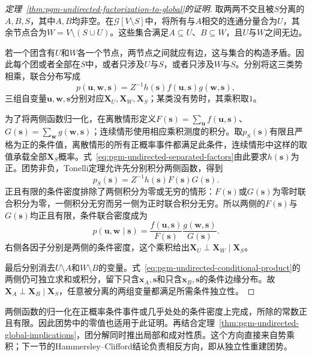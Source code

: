 \begin{proof}[定理~\ref{thm:pgm-undirected-factorization-to-global}的证明]
取两两不交且被$S$分离的$A,B,S$，其中$A,B$均非空。在$\mathcal{G}[V\setminus S]$中，将所有与$A$相交的连通分量合为$U$，其余节点合为$W=V\setminus(S\cup U)$。这些集合满足$A\subseteq U$、$B\subseteq W$，且$U$与$W$之间无边。

若一个团含有$U$和$W$各一个节点，两节点之间就应有边，这与集合的构造矛盾。因此每个团或者全部在$S$中，或者只涉及$U$与$S$，或者只涉及$W$与$S$。分别将这三类势相乘，联合分布写成
\begin{equation}
  p(\bm{u},\bm{w},\bm{s})
  =Z^{-1}h(\bm{s})f(\bm{u},\bm{s})g(\bm{w},\bm{s}),
  \label{eq:pgm-undirected-separated-factors}
\end{equation}
三组自变量$\bm{u},\bm{w},\bm{s}$分别对应$\bm{X}_U,\bm{X}_W,\bm{X}_S$；某类没有势时，其乘积取$1$。

为了将两侧函数归一化，在离散情形定义$F(\bm{s})=\sum_{\bm{u}}f(\bm{u},\bm{s})$、$G(\bm{s})=\sum_{\bm{w}}g(\bm{w},\bm{s})$；连续情形使用相应乘积测度的积分。取$p_S(\bm{s})$有限且严格为正的条件值，离散情形的所有正概率事件都满足此条件，连续情形中这样的取值承载全部$\bm{X}_S$概率。式~\eqref{eq:pgm-undirected-separated-factors}由此要求$h(\bm{s})$为正。团势非负，Tonelli定理允许先分别积分两侧函数，得到
\[
  p_S(\bm{s})=Z^{-1}h(\bm{s})F(\bm{s})G(\bm{s}).
\]
正且有限的条件密度排除了两侧积分为零或无穷的情形：$F(\bm{s})$或$G(\bm{s})$为零时联合积分为零，一侧积分无穷而另一侧为正时联合积分无穷。所以两侧的$F(\bm{s})$与$G(\bm{s})$均正且有限，条件联合密度成为
\begin{equation}
  p(\bm{u},\bm{w}\mid\bm{s})
  =\frac{f(\bm{u},\bm{s})}{F(\bm{s})}
   \frac{g(\bm{w},\bm{s})}{G(\bm{s})}.
  \label{eq:pgm-undirected-conditional-product}
\end{equation}
右侧各因子分别是两侧的条件密度，这个乘积给出$\bm{X}_U\perp\bm{X}_W\mid\bm{X}_S$。

最后分别消去$U\setminus A$和$W\setminus B$的变量。式~\eqref{eq:pgm-undirected-conditional-product}的两侧仍可独立求和或积分，留下只含$\bm{x}_A,\bm{s}$和只含$\bm{x}_B,\bm{s}$的条件边缘分布。故$\bm{X}_A\perp\bm{X}_B\mid\bm{X}_S$，任意被分离的两组变量都满足所需条件独立性。
\end{proof}

两侧函数的归一化在正概率条件事件或几乎处处的条件密度上完成，所除的常数正且有限。因此团势中的零值也适用于此证明。再结合定理~\ref{thm:pgm-undirected-global-implications}，团分解同时推出局部和成对性质。这个方向直接来自势乘积；下一节的Hammersley--Clifford结论负责相反方向，即从独立性重建团势。

